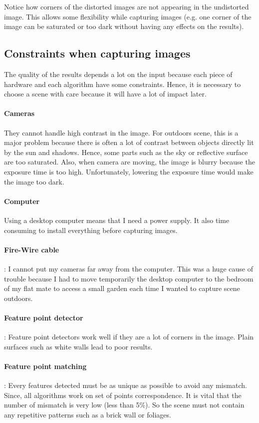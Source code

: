 \documentclass[11pt]{report}
\begin{document}
Notice how corners of the distorted images are not appearing in the undistorted image. This allows some flexibility while capturing images (e.g. one corner of the image can be saturated or too dark without having any effects on the results).

\subsection{Constraints when capturing images}

The quality of the results depends a lot on the input because each piece of hardware and each algorithm have some constraints. Hence, it is necessary to choose a scene with care because it will have a lot of impact later. 

\paragraph{Cameras} They cannot handle high contrast in the image. For outdoors scene, this is a major problem because there is often a lot of contrast between objects directly lit by the sun and shadows. Hence, some parts such as the sky or reflective surface are too saturated. Also, when camera are moving, the image is blurry because the exposure time is too high. Unfortunately, lowering the exposure time would make the image too dark.
\paragraph{Computer}
 Using a desktop computer means that I need a power supply. It also time consuming to install everything before capturing images.
\paragraph{Fire-Wire cable}: I cannot put my cameras far away from the computer. This was a huge cause of trouble because I had to move temporarily the desktop computer to the bedroom of my flat mate to access a small garden each time I wanted to capture scene outdoors.
\paragraph{Feature point detector}: Feature point detectors work well if they are a lot of corners in the image. Plain surfaces such as white walls lead to poor results.
\paragraph{Feature point matching}: Every features detected must be as unique as possible to avoid any mismatch. Since, all algorithms work on set of points correspondence. It is vital that the number of mismatch is very low (less than 5\%). So the scene must not contain any repetitive patterns such as a brick wall or foliages.
\end{document}
